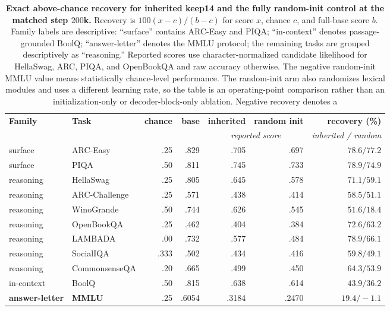 \begin{table}[t]
\centering
\small
\setlength{\tabcolsep}{4.5pt}
\begin{tabular}{@{}llrrrrr@{}}
\toprule
\textbf{Family} & \textbf{Task} & \textbf{chance} & \textbf{base} &
\textbf{inherited} & \textbf{random init} & \textbf{recovery (\%)} \\
& & & & \multicolumn{2}{c}{\textit{reported score}} &
\textit{inherited / random} \\
\midrule
surface & ARC-Easy & .25 & .829 & .705 & .697 & $78.6 / 77.2$ \\
surface & PIQA & .50 & .811 & .745 & .733 & $78.9 / 74.9$ \\
\midrule
reasoning & HellaSwag & .25 & .805 & .645 & .578 & $71.1 / 59.1$ \\
reasoning & ARC-Challenge & .25 & .571 & .438 & .414 & $58.5 / 51.1$ \\
reasoning & WinoGrande & .50 & .744 & .626 & .545 & $51.6 / 18.4$ \\
reasoning & OpenBookQA & .25 & .462 & .404 & .384 & $72.6 / 63.2$ \\
reasoning & LAMBADA & .00 & .732 & .577 & .484 & $78.9 / 66.1$ \\
reasoning & SocialIQA & .333 & .502 & .434 & .416 & $59.8 / 49.1$ \\
reasoning & CommonsenseQA & .20 & .665 & .499 & .450 & $64.3 / 53.9$ \\
\midrule
in-context & BoolQ & .50 & .815 & .638 & .614 & $43.9 / 36.2$ \\
\textbf{answer-letter} & \textbf{MMLU} & .25 & .6054 & .3184 & .2470 &
$\mathbf{19.4 / -1.1}$ \\
\bottomrule
\end{tabular}
\caption{\textbf{Exact above-chance recovery for inherited keep14 and the
fully random-init control at the matched step $200$k.}
Recovery is $100(x-c)/(b-c)$ for score $x$, chance $c$, and full-base score
$b$. Family labels are descriptive: ``surface'' contains ARC-Easy and PIQA;
``in-context'' denotes passage-grounded BoolQ; ``answer-letter'' denotes the
MMLU protocol; the remaining tasks are grouped descriptively as ``reasoning.'' Reported scores use character-normalized candidate likelihood for
HellaSwag, ARC, PIQA, and OpenBookQA and raw accuracy otherwise. The negative
random-init MMLU value means statistically chance-level performance. The random-init arm also randomizes lexical modules and uses a different learning
rate, so the table is an operating-point comparison rather than an
initialization-only or decoder-block-only ablation. Negative recovery denotes a
}
\end{table}
